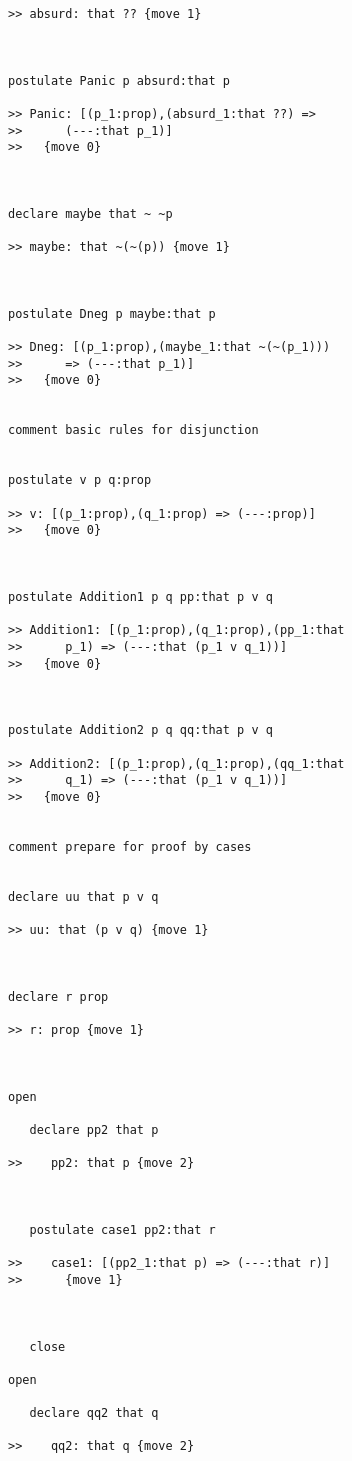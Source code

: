 \begin{verbatim}
>> absurd: that ?? {move 1}



postulate Panic p absurd:that p

>> Panic: [(p_1:prop),(absurd_1:that ??) =>
>>      (---:that p_1)]
>>   {move 0}



declare maybe that ~ ~p

>> maybe: that ~(~(p)) {move 1}



postulate Dneg p maybe:that p

>> Dneg: [(p_1:prop),(maybe_1:that ~(~(p_1)))
>>      => (---:that p_1)]
>>   {move 0}


comment basic rules for disjunction


postulate v p q:prop

>> v: [(p_1:prop),(q_1:prop) => (---:prop)]
>>   {move 0}



postulate Addition1 p q pp:that p v q

>> Addition1: [(p_1:prop),(q_1:prop),(pp_1:that
>>      p_1) => (---:that (p_1 v q_1))]
>>   {move 0}



postulate Addition2 p q qq:that p v q

>> Addition2: [(p_1:prop),(q_1:prop),(qq_1:that
>>      q_1) => (---:that (p_1 v q_1))]
>>   {move 0}


comment prepare for proof by cases


declare uu that p v q

>> uu: that (p v q) {move 1}



declare r prop

>> r: prop {move 1}



open

   declare pp2 that p

>>    pp2: that p {move 2}



   postulate case1 pp2:that r

>>    case1: [(pp2_1:that p) => (---:that r)]
>>      {move 1}



   close

open

   declare qq2 that q

>>    qq2: that q {move 2}




\end{verbatim}
